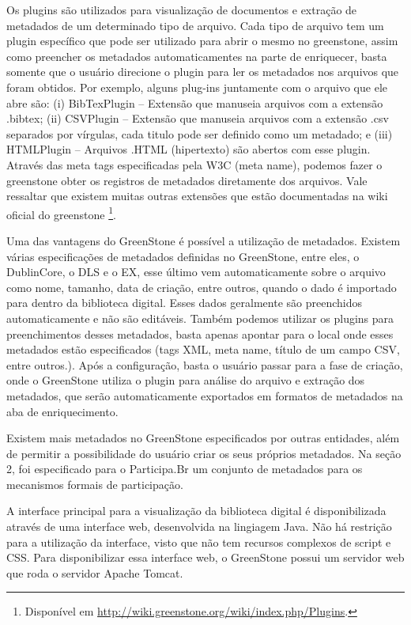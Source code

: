 Os plugins são utilizados para visualização de documentos e extração de metadados de um determinado tipo de arquivo. Cada tipo de arquivo tem um plugin específico que pode ser utilizado para abrir o mesmo no greenstone, assim como preencher os metadados automaticamentes na parte de enriquecer, basta somente que o usuário direcione o plugin para ler os metadados nos arquivos que foram obtidos. Por exemplo, alguns plug-ins juntamente com o arquivo que ele abre são: (i) BibTexPlugin – Extensão que manuseia arquivos com a extensão .bibtex; (ii) CSVPlugin – Extensão que manuseia arquivos com a extensão .csv separados por vírgulas, cada titulo pode ser definido como um metadado; e (iii) HTMLPlugin – Arquivos .HTML (hipertexto) são abertos com esse plugin. Através das meta tags especificadas pela W3C (meta name), podemos fazer o greenstone obter os registros de metadados diretamente dos arquivos. Vale ressaltar que existem muitas outras extensões que estão documentadas na wiki oficial do greenstone \footnote{Disponível em \url{http://wiki.greenstone.org/wiki/index.php/Plugins}.}.

Uma das vantagens do GreenStone é possível a utilização de metadados. Existem várias especificações de metadados definidas no GreenStone, entre eles, o DublinCore, o DLS e o EX, esse último vem automaticamente sobre o arquivo como nome, tamanho, data de criação, entre outros, quando o dado é importado para dentro da biblioteca digital. Esses dados geralmente são preenchidos automaticamente e não são editáveis. Também podemos utilizar os plugins para preenchimentos desses metadados, basta apenas apontar para o local onde esses metadados estão especificados (tags XML, meta name, título de um campo CSV, entre outros.). Após a configuração, basta o usuário passar para a fase de criação, onde o GreenStone utiliza o plugin para análise do arquivo e extração dos metadados, que serão automaticamente exportados em formatos de metadados na aba de enriquecimento.

Existem mais metadados no GreenStone especificados por outras entidades, além de permitir a possibilidade do usuário criar os seus próprios metadados. Na seção 2, foi especificado para o Participa.Br um conjunto de metadados para os mecanismos formais de participação.

A interface principal para a visualização da biblioteca digital é disponibilizada através de uma interface web, desenvolvida na lingiagem Java. Não há restrição para a utilização da interface, visto que não tem recursos complexos de script e CSS. Para disponibilizar essa interface web, o GreenStone possui um servidor web que roda o servidor Apache Tomcat.

